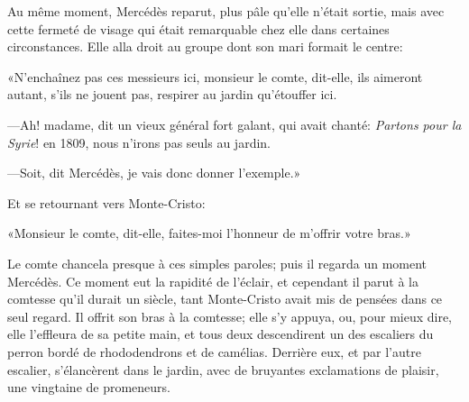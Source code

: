 Au même moment, Mercédès reparut, plus pâle qu'elle n'était sortie, mais avec cette fermeté de visage qui était remarquable chez elle dans certaines circonstances. Elle alla droit au groupe dont son mari formait le centre: 

«N'enchaînez pas ces messieurs ici, monsieur le comte, dit-elle, ils aimeront autant, s'ils ne jouent pas, respirer au jardin qu'étouffer ici. 

—Ah! madame, dit un vieux général fort galant, qui avait chanté: \textit{Partons pour la Syrie}! en 1809, nous n'irons pas seuls au jardin. 

—Soit, dit Mercédès, je vais donc donner l'exemple.» 

Et se retournant vers Monte-Cristo: 

«Monsieur le comte, dit-elle, faites-moi l'honneur de m'offrir votre bras.» 

Le comte chancela presque à ces simples paroles; puis il regarda un moment Mercédès. Ce moment eut la rapidité de l'éclair, et cependant il parut à la comtesse qu'il durait un siècle, tant Monte-Cristo avait mis de pensées dans ce seul regard. Il offrit son bras à la comtesse; elle s'y appuya, ou, pour mieux dire, elle l'effleura de sa petite main, et tous deux descendirent un des escaliers du perron bordé de rhododendrons et de camélias. Derrière eux, et par l'autre escalier, s'élancèrent dans le jardin, avec de bruyantes exclamations de plaisir, une vingtaine de promeneurs. 